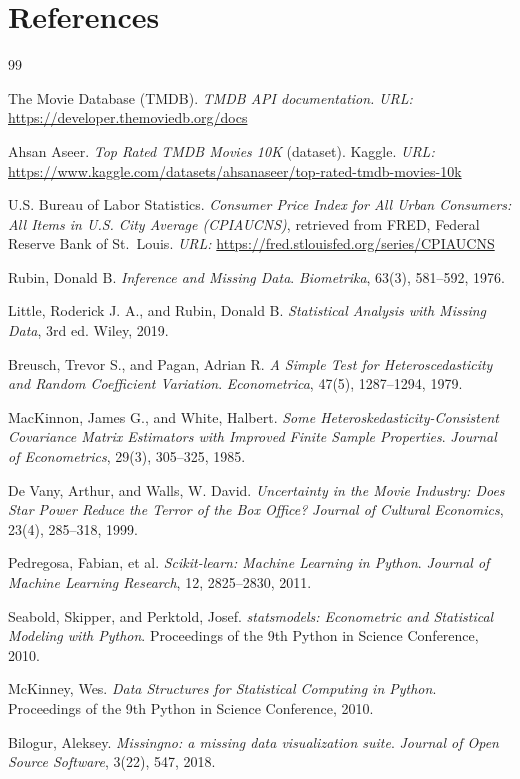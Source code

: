 \documentclass[a4paper,12pt]{report}
\begin{document}
\chapter*{References}
\renewcommand{\chapter}[2]{}
\begin{thebibliography}{99}

The Movie Database (TMDB). \emph{TMDB API documentation.}
\emph{URL:} \url{https://developer.themoviedb.org/docs}

Ahsan Aseer. \emph{Top Rated TMDB Movies 10K} (dataset). Kaggle.
\emph{URL:} \url{https://www.kaggle.com/datasets/ahsanaseer/top-rated-tmdb-movies-10k}

U.S. Bureau of Labor Statistics. \emph{Consumer Price Index for All Urban Consumers: All Items in U.S. City Average (CPIAUCNS)}, retrieved from FRED, Federal Reserve Bank of St.\ Louis.
\emph{URL:} \url{https://fred.stlouisfed.org/series/CPIAUCNS}

Rubin, Donald B. \emph{Inference and Missing Data}. \emph{Biometrika}, 63(3), 581--592, 1976.

Little, Roderick J. A., and Rubin, Donald B. \emph{Statistical Analysis with Missing Data}, 3rd ed. Wiley, 2019.

Breusch, Trevor S., and Pagan, Adrian R. \emph{A Simple Test for Heteroscedasticity and Random Coefficient Variation}. \emph{Econometrica}, 47(5), 1287--1294, 1979.

MacKinnon, James G., and White, Halbert. \emph{Some Heteroskedasticity-Consistent Covariance Matrix Estimators with Improved Finite Sample Properties}. \emph{Journal of Econometrics}, 29(3), 305--325, 1985.

De Vany, Arthur, and Walls, W. David. \emph{Uncertainty in the Movie Industry: Does Star Power Reduce the Terror of the Box Office?} \emph{Journal of Cultural Economics}, 23(4), 285--318, 1999.

Pedregosa, Fabian, et al. \emph{Scikit-learn: Machine Learning in Python}. \emph{Journal of Machine Learning Research}, 12, 2825--2830, 2011.

Seabold, Skipper, and Perktold, Josef. \emph{statsmodels: Econometric and Statistical Modeling with Python}. Proceedings of the 9th Python in Science Conference, 2010.

McKinney, Wes. \emph{Data Structures for Statistical Computing in Python}. Proceedings of the 9th Python in Science Conference, 2010.

Bilogur, Aleksey. \emph{Missingno: a missing data visualization suite}. \emph{Journal of Open Source Software}, 3(22), 547, 2018.

\end{thebibliography}
\end{document}
